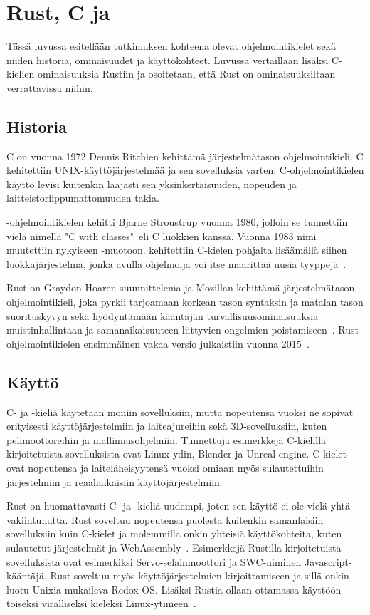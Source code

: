 \chapter{Rust, C ja \Cpp} \label{esittely}
Tässä luvussa esitellään tutkimuksen kohteena olevat ohjelmointikielet sekä niiden historia, ominaisuudet ja käyttökohteet. Luvussa vertaillaan lisäksi C-kielien ominaisuuksia Rustiin ja osoitetaan, että Rust on ominaisuuksiltaan verrattavissa niihin.
\section{Historia}
C on vuonna 1972 Dennis Ritchien kehittämä järjestelmätason ohjelmointikieli. C kehitettiin UNIX-käyttöjärjestelmää ja sen sovelluksia varten. C-ohjelmointikielen käyttö levisi kuitenkin laajasti sen yksinkertaisuuden, nopeuden ja laitteistoriippumattomuuden takia.~\cite[pp.~ix--xi]{Cbook}

\Cpp -ohjelmointikielen kehitti Bjarne Stroustrup vuonna 1980, jolloin se tunnettiin vielä nimellä "C with classes"~eli C luokkien kanssa. Vuonna 1983 nimi muutettiin nykyiseen \Cpp-muotoon. \Cpp kehitettiin C-kielen pohjalta lisäämällä siihen luokkajärjestelmä, jonka avulla ohjelmoija voi itse määrittää uusia tyyppejä~\cite[pp.~v--xii]{Cppbook}.

Rust on Graydon Hoaren suunnittelema ja Mozillan kehittämä järjestelmätason ohjelmointikieli, joka pyrkii tarjoamaan korkean tason syntaksin ja matalan tason suorituskyvyn sekä hyödyntämään kääntäjän turvallisuusominaisuuksia muistinhallintaan ja samanaikaisuuteen liittyvien ongelmien poistamiseen~\cite{mozillarust}. Rust-ohjelmointikielen ensimmäinen vakaa versio julkaistiin vuonna 2015~\cite{rust1blog}.

\section{Käyttö}

C- ja \Cpp-kieliä käytetään moniin sovelluksiin, mutta nopeutensa vuoksi ne sopivat erityisesti käyttöjärjestelmiin ja laiteajureihin sekä 3D-sovelluksiin, kuten pelimoottoreihin ja mallinnusohjelmiin. Tunnettuja esimerkkejä C-kielillä kirjoitetuista sovelluksista ovat Linux-ydin, Blender ja Unreal engine. C-kielet ovat nopeutensa ja laiteläheisyytensä vuoksi omiaan myös sulautettuihin järjestelmiin ja reaaliaikaisiin käyttöjärjestelmiin.

Rust on huomattavasti C- ja \Cpp-kieliä uudempi, joten sen käyttö ei ole vielä yhtä vakiintunutta. Rust soveltuu nopeutensa puolesta kuitenkin samanlaisiin sovelluksiin kuin C-kielet ja molemmilla onkin yhteisiä käyttökohteita, kuten sulautetut järjestelmät ja WebAssembly~\cite{webassembly}. Esimerkkejä Rustilla kirjoitetuista sovelluksista ovat esimerkiksi Servo-selainmoottori ja SWC-niminen Javascript-kääntäjä. Rust soveltuu myös käyttöjärjestelmien kirjoittamiseen ja sillä onkin luotu Unixia mukaileva Redox OS. Lisäksi Rustia ollaan ottamassa käyttöön toiseksi viralliseksi kieleksi Linux-ytimeen~\cite{rustkernel}.

